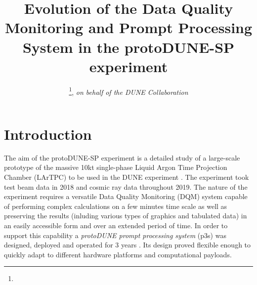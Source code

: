 \documentclass{webofc}
\newcommand{\pd}{protoDUNE\xspace}
\begin{document}
%
\title{Evolution of the Data Quality Monitoring and Prompt Processing System in the protoDUNE-SP experiment}


\author{
\fnsep\thanks{}, \it{on behalf of the DUNE Collaboration}
}



%
\maketitle
%
\section{Introduction}
\label{sec:intro}

The aim of the \pd-SP experiment  \cite{spanu} is a detailed study of a large-scale prototype
of the massive 10kt single-phase Liquid Argon Time Projection Chamber (LArTPC) to be used
in the DUNE experiment  \cite{cdrVol1, cdrVol4}. The experiment took test beam data in
2018 and cosmic ray data throughout 2019. The nature of the experiment requires a versatile
Data Quality Monitoring (DQM) system capable of performing complex calculations on
a few minutes time scale as well as preserving the results (inluding various types of graphics
and tabulated data) in an easily accessible form and over an extended period of time.
In order to support this capability a \textit{protoDUNE prompt processing system} (p3s)
was designed, deployed and operated for 3 years \cite{eps}. Its design proved flexible
enough to quickly adapt to different hardware platforms and computational payloads.
\end{document}

